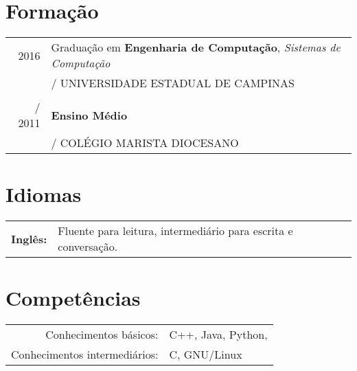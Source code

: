 \documentclass[a4paper,10pt]{article} %
\makeatletter
\def\fakesc#1{%
  \begingroup%
  \xdef\fake@name{\csname\curr@fontshape/\f@size\endcsname}%
  \fontsize{\fontdimen8\fake@name}{\baselineskip}\selectfont%
  \uppercase{#1}%
  \endgroup%
}
\renewcommand{\textsc}{\fakesc}
\makeatother
\begin{document}

\section{Formação}

\begin{tabular}{r|l}	

  \textsc{2016} & Graduação em \textsc{}\textbf{Engenharia de Computação}, \small\emph{Sistemas de Computação}\\
& \normalsize\textsc{Universidade Estadual de Campinas}\\
\multicolumn{2}{c}{}\\

  \textsc{2011} & \textbf{Ensino Médio}\\ & \textsc{Colégio Marista Diocesano}
\end{tabular}



\section{Idiomas}

\begin{tabular}{rl}
  \textbf{Inglês:} & Fluente para leitura, intermediário para escrita e conversação.\\
\end{tabular}


\section{Competências}

\begin{tabular}{rl}
  Conhecimentos básicos: & C++, Java, Python, \setmainfont{cmr10}{\fb \LaTeX} \setmainfont[SmallCapsFont=Fontin SmallCaps]{Fontin Sans}
  \\

  Conhecimentos intermediários: & C, GNU/Linux \\
\end{tabular}
\end{document}
